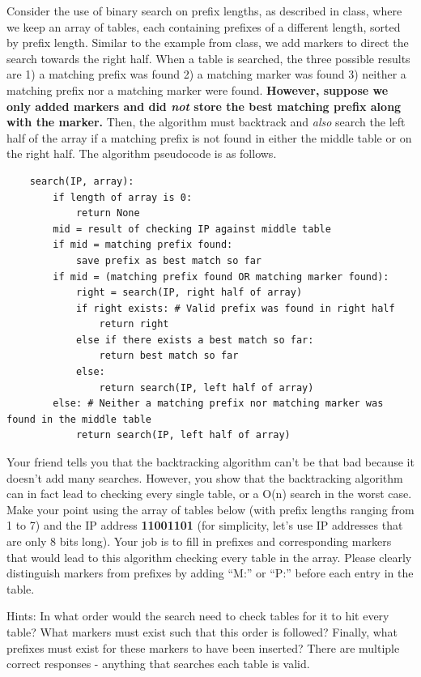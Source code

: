 \documentclass[10pt]{article}
\newenvironment{problem}[2][]{\begin{trivlist}
\item[\hskip \labelsep {\bfseries #1}\hskip \labelsep {\bfseries #2.}]}{\end{trivlist}}
\begin{document}
\newpage
\begin{problem}{7: Binary Search on Prefix Lengths}
Consider the use of binary search on prefix lengths, as described in class, where we keep an array of tables, each containing prefixes of a different length, sorted by prefix length. Similar to the example from class, we add markers to direct the search towards the right half. When a table is searched, the three possible results are 1) a matching prefix was found 2) a matching marker was found 3) neither a matching prefix nor a matching marker were found. \textbf{However, suppose we only added markers and did \emph{not} store the best matching prefix along with the marker.} Then, the algorithm must backtrack and \emph{also} search the left half of the array if a matching prefix is not found in either the middle table or on the right half. The algorithm pseudocode is as follows. 

\begin{verbatim}
    search(IP, array):
        if length of array is 0:
            return None
        mid = result of checking IP against middle table
        if mid = matching prefix found:
            save prefix as best match so far
        if mid = (matching prefix found OR matching marker found):
            right = search(IP, right half of array)
            if right exists: # Valid prefix was found in right half
                return right
            else if there exists a best match so far:
                return best match so far
            else:
                return search(IP, left half of array)
        else: # Neither a matching prefix nor matching marker was found in the middle table
            return search(IP, left half of array)
\end{verbatim}
Your friend tells you that the backtracking algorithm can't be that bad because it doesn't add many searches. However, you show that the backtracking algorithm can in fact lead to checking every single table, or a O(n) search in the worst case. 
\\Make your point using the array of tables below (with prefix lengths ranging from 1 to 7) and the IP address \textbf{11001101} (for simplicity, let's use IP addresses that are only 8 bits long). Your job is to fill in prefixes and corresponding markers that would lead to this algorithm checking every table in the array. Please clearly distinguish markers from prefixes by adding ``M:'' or ``P:'' before each entry in the table.
    
Hints: In what order would the search need to check tables for it to hit every table? What markers must exist such that this order is followed? Finally, what prefixes must exist for these markers to have been inserted? There are multiple correct responses - anything that searches each table is valid.


\end{problem}
\end{document}
